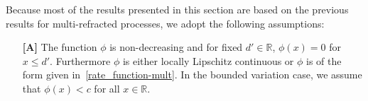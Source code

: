 \documentclass[12pt,reqno]{amsart}
\newcommand{\red}{\textcolor[rgb]{1.00,0.00,0.00}}
\newcommand{\blue}{\textcolor[rgb]{0.00,0.00,1.00}}
\theoremstyle{definition}
\theoremstyle{remark}
\newtheorem{remark}[theorem]{Remark}
\begin{document}
Because most of the results presented in this section are based
on the previous results for multi-refracted processes, we adopt the following assumptions:
\begin{enumerate}
	\item[\textbf{[A]}]
The function $\phi$ is non-decreasing and for fixed $d' \in \mathbb{R}$, $\phi(x)=0$ for $x \leq d'$.   %
Furthermore $\phi$ is either locally Lipschitz continuous or $\phi$ is of the form given in~\eqref{rate_function-mult}. In the bounded variation case, we assume that $\phi(x)<c$ for all $x\in\mathbb{R}$.
\end{enumerate}


%
\end{document}
